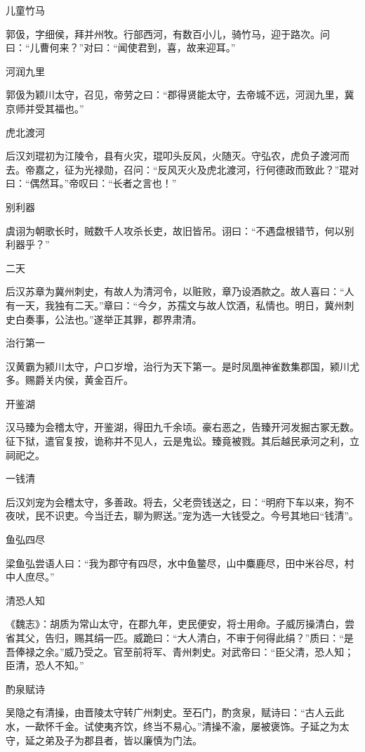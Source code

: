 \documentclass[a4paper,12pt,UTF8,twoside]{ctexbook}
\begin{document}
    儿童竹马
    
    郭伋，字细侯，拜并州牧。行部西河，有数百小儿，骑竹马，迎于路次。问曰：“儿曹何来？”对曰：“闻使君到，喜，故来迎耳。”
    
    河润九里
    
    郭伋为颖川太守，召见，帝劳之曰：“郡得贤能太守，去帝城不远，河润九里，冀京师并受其福也。”
    
    虎北渡河
    
    后汉刘琨初为江陵令，县有火灾，琨叩头反风，火随灭。守弘农，虎负子渡河而去。帝嘉之，征为光禄勋，召问：“反风灭火及虎北渡河，行何德政而致此？”琨对曰：“偶然耳。”帝叹曰：“长者之言也！”
    
    别利器
    
    虞诩为朝歌长时，贼数千人攻杀长吏，故旧皆吊。诩曰：“不遇盘根错节，何以别利器乎？”
    
    二天
    
    后汉苏章为冀州刺史，有故人为清河令，以赃败，章乃设酒款之。故人喜曰：“人有一天，我独有二天。”章曰：“今夕，苏孺文与故人饮酒，私情也。明日，冀州刺史白奏事，公法也。”遂举正其罪，郡界肃清。
    
    治行第一
    
    汉黄霸为颍川太守，户口岁增，治行为天下第一。是时凤凰神雀数集郡国，颍川尤多。赐爵关内侯，黄金百斤。
    
    开鉴湖
    
    汉马臻为会稽太守，开鉴湖，得田九千余顷。豪右恶之，告臻开河发掘古冢无数。征下狱，遣官复按，诡称并不见人，云是鬼讼。臻竟被戮。其后越民承河之利，立祠祀之。
    
    一钱清
    
    后汉刘宠为会稽太守，多善政。将去，父老赍钱送之，曰：“明府下车以来，狗不夜吠，民不识吏。今当迁去，聊为赆送。”宠为选一大钱受之。今号其地曰“钱清”。
    
    鱼弘四尽
    
    梁鱼弘尝语人曰：“我为郡守有四尽，水中鱼鳖尽，山中麋鹿尽，田中米谷尽，村中人庶尽。”
    
    清恐人知
    
    《魏志》：胡质为常山太守，在郡九年，吏民便安，将士用命。子威厉操清白，尝省其父，告归，赐其绢一匹。威跪曰：“大人清白，不审于何得此绢？”质曰：“是吾俸禄之余。”威乃受之。官至前将军、青州刺史。对武帝曰：“臣父清，恐人知；臣清，恐人不知。”
    
    酌泉赋诗
    
    吴隐之有清操，由晋陵太守转广州刺史。至石门，酌贪泉，赋诗曰：“古人云此水，一歃怀千金。试使夷齐饮，终当不易心。”清操不渝，屡被褒饰。子延之为太守，延之弟及子为郡县者，皆以廉慎为门法。
    
\end{document}
